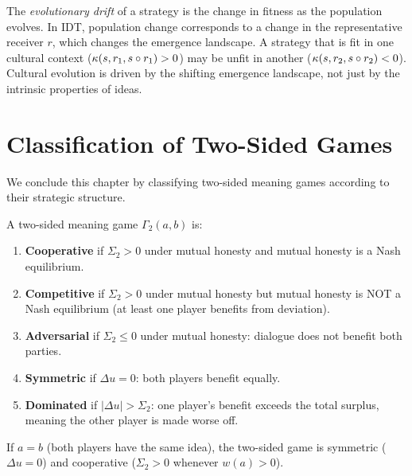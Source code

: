 \begin{remark}
The \emph{evolutionary drift} of a strategy is the change in fitness
as the population evolves. In IDT, population change corresponds to
a change in the representative receiver $r$, which changes the
emergence landscape. A strategy that is fit in one cultural context
($\kappa(s, r_1, s \circ r_1) > 0$) may be unfit in another
($\kappa(s, r_2, s \circ r_2) < 0$). Cultural evolution is
driven by the shifting emergence landscape, not just by the intrinsic
properties of ideas.
\end{remark}


\section{Classification of Two-Sided Games}

We conclude this chapter by classifying two-sided meaning games according
to their strategic structure.

\begin{definition}
\label{def:game-classification}
A two-sided meaning game $\Gamma_2(a, b)$ is:
\begin{enumerate}
\item \textbf{Cooperative} if $\Sigma_2 > 0$ under mutual honesty and
mutual honesty is a Nash equilibrium.
\item \textbf{Competitive} if $\Sigma_2 > 0$ under mutual honesty but
mutual honesty is NOT a Nash equilibrium (at least one player benefits from
deviation).
\item \textbf{Adversarial} if $\Sigma_2 \leq 0$ under mutual honesty:
dialogue does not benefit both parties.
\item \textbf{Symmetric} if $\Delta u = 0$: both players benefit equally.
\item \textbf{Dominated} if $|\Delta u| > \Sigma_2$: one player's benefit
exceeds the total surplus, meaning the other player is made worse off.
\end{enumerate}
\end{definition}

\begin{theorem}
\label{thm:symmetric-cooperative}
If $a = b$ (both players have the same idea), the two-sided game is
symmetric ($\Delta u = 0$) and cooperative ($\Sigma_2 > 0$ whenever
$w(a) > 0$).
\end{theorem}

